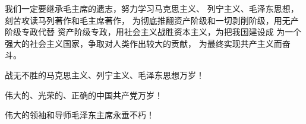 \begin{hongqiarticle}
  我们一定要继承毛主席的遗志，努力学习马克思主义、
  列宁主义、毛泽东思想，刻苦攻读马列著作和毛主席著作，
  为彻底推翻资产阶级和一切剥削阶级，用无产阶级专政代替
  资产阶级专政，用社会主义战胜资本主义，为把我国建设成
  为一个强大的社会主义国家，争取对人类作出较大的贡献，
  为最终实现共产主义而奋斗。

  战无不胜的马克思主义、列宁主义、毛泽东思想万岁！

  伟大的、光荣的、正确的中国共产党万岁！

  伟大的领袖和导师毛泽东主席永垂不朽！

\end{hongqiarticle}
